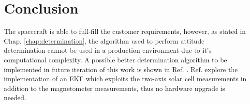 \documentclass[11pt,a4paper]{report}
\begin{document}
\chapter{Conclusion}
The spacecraft is able to full-fill the customer requirements, however, as stated in Chap. \ref{chap:determination}, the algorithm used to perform attitude determination cannot be used in a production environment due to it's computational complexity.
A possible better determination algorithm to be implemented in future iteration of this work is shown in Ref. \cite{Ref:Articles:Pela}.
Ref. \cite{Ref:Articles:Pela} explore the implementation of an EKF which exploits the two-axis solar cell measurements in addition to the magnetometer measurements, thus no hardware upgrade is needed.
\newpage
\end{document}
